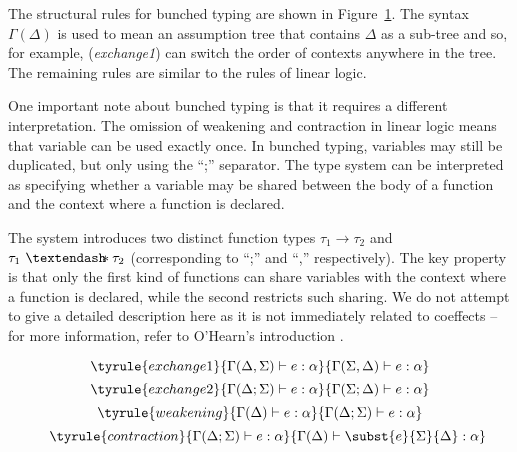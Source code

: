 The structural rules for bunched typing are shown in Figure~\ref{fig:substructural-bunched}.
The syntax $\Gamma(\Delta)$ is used to mean an assumption tree that contains $\Delta$ as a
sub-tree and so, for example, (\emph{exchange1}) can switch the order of contexts anywhere in the
tree. The remaining rules are similar to the rules of linear logic.

One important note about bunched typing is that it requires a different interpretation. The omission
of weakening and contraction in linear logic means that variable can be used exactly once.
In bunched typing, variables may still be duplicated, but only using the ``;'' separator.
The type system can be interpreted as specifying whether a variable may be shared between the
body of a function and the context where a function is declared.

The system introduces two
distinct function types $\tau_1 \rightarrow \tau_2$ and $\tau_1~ \textendash\!\!\!\ast \tau_2$
(corresponding to ``;'' and ``,'' respectively). The key property is that only the first kind
of functions can share variables with the context where a function is declared, while the second
restricts such sharing. We do not attempt to give a detailed description here as it is not
immediately related to coeffects -- for more information, refer to O'Hearn's introduction
\cite{substruct-bunched}.

\begin{figure}
\begin{equation*}
\tyrule{exchange1}
  {\Gamma(\Delta, \Sigma) \vdash e : \alpha}
  {\Gamma(\Sigma, \Delta) \vdash e : \alpha}
\end{equation*}
\begin{equation*}
\tyrule{exchange2}
  {\Gamma(\Delta; \Sigma) \vdash e : \alpha}
  {\Gamma(\Sigma; \Delta) \vdash e : \alpha}
\end{equation*}
\begin{equation*}
\tyrule{weakening}
  {\Gamma(\Delta) \vdash e : \alpha}
  {\Gamma(\Delta; \Sigma) \vdash e : \alpha}
\end{equation*}
\begin{equation*}
\tyrule{contraction}
  {\Gamma(\Delta; \Sigma) \vdash e : \alpha}
  {\Gamma(\Delta) \vdash \subst{e}{\Sigma}{\Delta} : \alpha}
\end{equation*}
\label{fig:substructural-bunched}
\end{figure}



